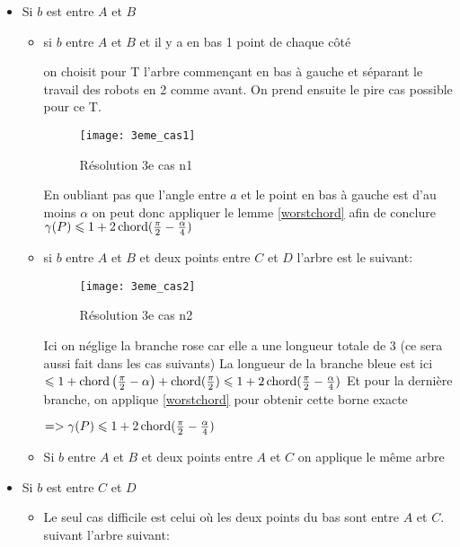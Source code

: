 \begin{itemize}

\item Si $b$ est entre $A$ et $B$

\begin{itemize}

\item si $b$ entre $A$ et $B$ et il y a en bas 1 point de chaque côté

on choisit pour T l'arbre commençant en bas à gauche et séparant le travail des robots en 2 comme avant.
On prend ensuite le pire cas possible pour ce T.

\begin{figure}[h!]
  \centering
  \texttt{[image: 3eme\_cas1]}
  \caption{Résolution 3e cas n1}
  \label{fig:3eme_cas1}
\end{figure}

En oubliant pas que l'angle entre $a$ et le point en bas à gauche est d'au moins $\alpha$ on peut donc appliquer le lemme \ref{worstchord} afin de conclure
$\gamma(P) \leqslant 1 + 2\operatorname{chord}(\frac{\pi}{2} - \frac{\alpha}{4})$

\item si $b$ entre $A$ et $B$ et deux points entre $C$ et $D$
l'arbre est le suivant:

\begin{figure}[h!]
  \centering
  \texttt{[image: 3eme\_cas2]}
  \caption{Résolution 3e cas n2}
  \label{fig:3eme_cas2}
\end{figure}

Ici on néglige la branche rose car elle a une longueur totale de 3 (ce sera aussi fait dans les cas suivants)
La longueur de la branche bleue est ici $\leqslant 1+\operatorname{chord}\left(\frac{\pi}{2} - \alpha\right)+\operatorname{chord}(\frac{\pi}{2}) \leqslant 1 + 2\operatorname{chord}(\frac{\pi}{2} - \frac{\alpha}{4})$
Et pour la dernière branche, on applique \ref{worstchord} pour obtenir cette borne exacte

$=> \gamma(P) \leqslant 1 + 2\operatorname{chord}(\frac{\pi}{2} - \frac{\alpha}{4})$

\item Si $b$ entre $A$ et $B$ et deux points entre $A$ et $C$ on applique le même arbre

\end{itemize}

\item Si $b$ est entre $C$ et $D$

\begin{itemize}

\item Le seul cas difficile est celui où les deux points du bas sont entre $A$ et $C$.
suivant l'arbre suivant:


\end{itemize}
\end{itemize}
